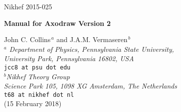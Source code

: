 \documentclass[12pt]{article}
\def\program#1{\texttt{#1}}
\begin{document}



\setcounter{page}{0}
\thispagestyle{empty}
\hfill \begin{minipage}{3.0cm}
Nikhef 2015-025
\end{minipage}
\vspace{20mm}

\begin{center}
{\LARGE\bf\sc Manual for Axodraw Version 2}
\end{center}
\vspace{5mm}
\begin{center}
{\large John C. Collins$^{\, a}$ and J.A.M. Vermaseren$^{\, b}$} 
\vspace{1cm}\\
{\it $^a$ Department of Physics, Pennsylvania State University, \\
\vspace{0.1cm}
University Park, Pennsylvania 16802, USA} \\
\texttt{jcc8 at psu dot edu} \\
\vspace{0.5cm}
{\it $^b$Nikhef Theory Group \\
\vspace{0.1cm}
Science Park 105, 1098 XG Amsterdam, The Netherlands} \\
\texttt{t68 at nikhef dot nl} \\
\vspace{1.0cm}
(15 February 2018)
\end{center}
\vspace{5mm}

\begin{abstract}
This is the reference manual for version two of the \LaTeX{} graphical
style file Axodraw.  
Relative to version one,
it has a number of new drawing primitives and many extra options, and 
it can now work with \program{pdflatex} to directly produce
output in PDF file format (but with the aid of an auxiliary program).
\end{abstract}
\end{document}
